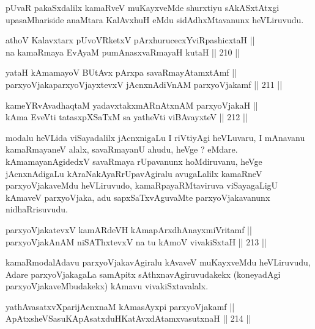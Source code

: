 \begin{artha}
pUvaR pakaSxdalilx kamaRveV muKayxveMde shurxtiyu sAkASxtAtxgi
upasaMhariside anaMtara KalAvxhuH eMdu sidAdhxMtavanunx heVLiruvudu.
\end{artha}


\begin{shl}
athoV Kalavxtarx pUvoVRketxV pArxhurucecxYviRpashicxtaH || \\
na kamaRmaya EvAyaM pumAnasxvaRmayaH kutaH \hfill || 210 ||  
\end{shl}

\begin{shl}
yataH kAmamayoV BUtAvx pArxpa savaRmayAtamxtAmf || \\
parxyoVjakaparxyoVjayxtevxV jAcnxnAdiVnAM parxyoVjakamf \hfill || 211 ||  
\end{shl}

\begin{shl}
kameYRvAvadhaqtaM yadavxtakxmARnAtxnAM parxyoVjakaH || \\
kAma EveVti tatasxpXSaTxM sa yatheVti viBAvayxteV \hfill || 212 ||  
\end{shl}

\begin{artha}
modalu heVLida viSayadalilx jAcnxnigaLu I riVtiyAgi heVLuvaru, I
mAnavanu kamaRmayaneV alalx, savaRmayanU ahudu, heVge ?
eMdare. kAmamayanAgidedxV savaRmaya rUpavanunx hoMdiruvanu, heVge
jAcnxnAdigaLu kAraNakAyaRrUpavAgiralu avugaLalilx kamaRneV
parxyoVjakaveMdu heVLiruvudo, kamaRpayaRMtaviruva viSayagaLigU
kAmaveV parxyoVjaka, adu sapxSaTxvAguvaMte parxyoVjakavanunx
nidhaRrisuvudu.
\end{artha}

\begin{shl}
parxyoVjakatevxV kamARdeVH kAmapArxdhAnayxmiVritamf || \\
parxyoVjakAnAM niSAThxtevxV na tu kAmoV vivakiSxtaH \hfill || 213 ||  
\end{shl}

\begin{artha}
kamaRmodalAdavu parxyoVjakavAgiralu kAvaveV muKayxveMdu heVLiruvudu,
Adare parxyoVjakagaLa samApitx sAthxnavAgiruvudakekx (koneyadAgi
parxyoVjakaveMbudakekx) kAmavu vivakiSxtavalalx.
\end{artha}

\begin{shl}
yathAvasatxvXparijAcnxnaM kAmasAyxpi parxyoVjakamf ||  \\
ApAtxsheVSasuKApAsatxduHKatAvxdAtamxvasutxnaH \hfill || 214 ||  
\end{shl}

